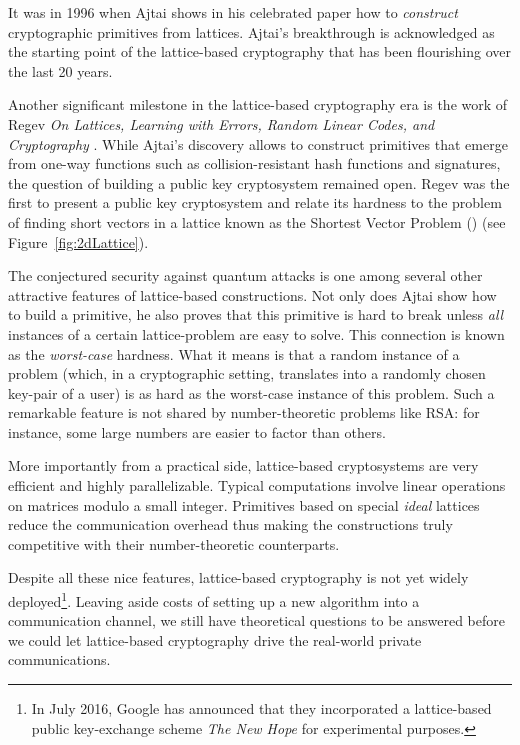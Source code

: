 It was in 1996 when Ajtai shows in his celebrated paper \cite{STOC:Ajtai96} how to \emph{construct} cryptographic primitives from lattices. Ajtai's breakthrough is acknowledged as the starting point of the lattice-based cryptography that has been flourishing over the last 20 years.

Another significant milestone in the lattice-based cryptography era is the work of Regev \emph{On Lattices, Learning with Errors, Random Linear Codes, and Cryptography} \cite{STOC:Regev05}. While Ajtai's discovery allows to construct primitives that emerge from one-way functions such as collision-resistant hash functions and signatures, the question of building a public key cryptosystem remained open. Regev was the first to present a public key cryptosystem and relate its hardness to the problem of finding short vectors in a lattice known as the Shortest Vector Problem (\SVP) (see Figure~\ref{fig:2dLattice}).

The conjectured security against quantum attacks is one among several other attractive features of lattice-based constructions. Not only does Ajtai show how to build a primitive, he also proves that this primitive is hard to break unless \emph{all} instances of a certain lattice-problem are easy to solve. This connection is known as the \emph{worst-case} hardness. What it means is that a random instance of a problem (which, in a cryptographic setting, translates into a randomly chosen key-pair of a user) is as hard as the worst-case instance of this problem. Such a remarkable feature is not shared by number-theoretic problems like RSA: for instance, some large numbers are easier to factor than others. 

More importantly from a practical side, lattice-based cryptosystems are very efficient and highly parallelizable. Typical computations involve linear operations on matrices modulo a small integer. Primitives based on special \emph{ideal} lattices reduce the communication overhead thus making the constructions truly competitive with their number-theoretic counterparts.

Despite all these nice features, lattice-based cryptography is not yet widely deployed\footnote{In July 2016, Google has announced \cite{Google} that they incorporated a lattice-based public key-exchange scheme \emph{The New Hope} \cite{NewHope} for experimental purposes.}. Leaving aside costs of setting up a new algorithm into a communication channel, we still have theoretical questions to be answered before we could let lattice-based cryptography drive the real-world private communications. 

